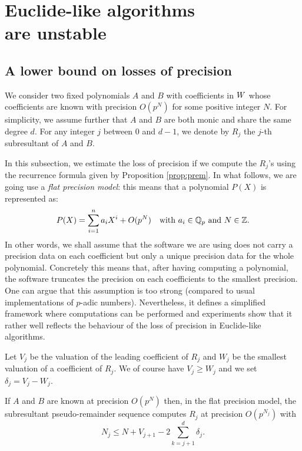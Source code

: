 \documentclass{sig-alternate}
\begin{document}
\section{Euclide-like algorithms\\are unstable}


\subsection{A lower bound on losses of precision}

We consider two fixed polynomials $A$ and $B$ with coefficients in $W$ 
whose coefficients are known with precision $O(p^N)$ for some positive
integer $N$. For simplicity, we assume further that $A$ and $B$ are both
monic and share the same degree $d$. 
For any integer $j$ between $0$ and $d-1$, we denote by $R_j$ the $j$-th 
subresultant of $A$ and $B$.

In this subsection, we estimate the loss of precision if we compute the 
$R_j$'s using the recurrence formula given by Proposition \ref{prop:prem}. 
In what follows, we are going use a \emph{flat precision model}: this 
means that a polynomial $P(X)$ is represented as:
$$P(X) = \sum_{i=1}^n a_i X^i + O(p^N)
\quad \text{with } a_i \in \mathbb Q_p \text{ and } N \in \mathbb Z.$$
In other words, we shall assume that the software we are using does not
carry a precision data on each coefficient but only a unique precision
data for the whole polynomial. Concretely this means that, after having
computing a polynomial, the software truncates the precision on each
coefficients to the smallest precision. 
One can argue that this assumption is too strong (compared to usual
implementations of $p$-adic numbers). Nevertheless, it defines a 
simplified framework where computations can be performed and experiments 
show that it rather well reflects the behaviour of the loss of precision 
in Euclide-like algorithms.

Let $V_j$ be the valuation of the leading coefficient of $R_j$ and $W_j$ 
be the smallest valuation of a coefficient of $R_j$. We of course have 
$V_j \geq W_j$ and we set $\delta_j = V_j - W_j$.

\begin{prop}
\label{prop:precEuclide}
If $A$ and $B$ are known at precision $O(p^N)$ then, in the flat 
precision model, the subresultant pseudo-remainder sequence computes 
$R_j$ at precision $O(p^{N_j})$ with
$$N_j \leq N + V_{j+1} - 2 \sum_{k=j+1}^d \delta_j.$$
\end{prop}
\end{document}
